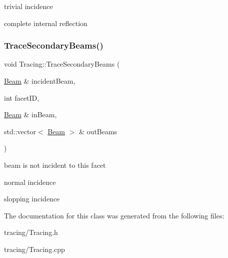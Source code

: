 trivial incidence

complete internal reflection \mbox{\label{class_tracing_a1eb24906dd1db23bdffbdfc4d7864baf}} 
\subsubsection{\texorpdfstring{Trace\+Secondary\+Beams()}{TraceSecondaryBeams()}}
{\footnotesize\ttfamily void Tracing\+::\+Trace\+Secondary\+Beams (\begin{DoxyParamCaption}\item[{\mbox{\hyperlink{class_beam}{Beam}} \&}]{incident\+Beam,  }\item[{int}]{facet\+ID,  }\item[{\mbox{\hyperlink{class_beam}{Beam}} \&}]{in\+Beam,  }\item[{std\+::vector$<$ \mbox{\hyperlink{class_beam}{Beam}} $>$ \&}]{out\+Beams }\end{DoxyParamCaption})\hspace{0.3cm}{\ttfamily [protected]}}

beam is not incident to this facet

normal incidence

slopping incidence 

The documentation for this class was generated from the following files\+:\begin{DoxyCompactItemize}
\item 
tracing/Tracing.\+h\item 
tracing/Tracing.\+cpp\end{DoxyCompactItemize}
